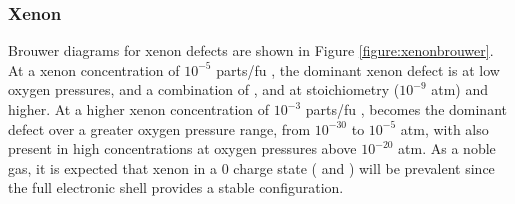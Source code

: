 \subsubsection{Xenon}

Brouwer diagrams for xenon defects are shown in Figure \ref{figure:xenonbrouwer}. At a xenon concentration of $10^{-5}$ parts/fu \zirconia , the dominant xenon defect is  at low oxygen pressures, and a combination of ,  and  at stoichiometry ($10^{-9}$ atm) and higher. At a higher xenon concentration of $10^{-3}$ parts/fu \zirconia ,  becomes the dominant defect over a greater oxygen pressure range, from $10^{-30}$ to $10^{-5}$ atm, with  also present in high concentrations at oxygen pressures above $10^{-20}$ atm. As a noble gas, it is expected that xenon in a 0 charge state ( and ) will be prevalent since the full electronic shell provides a stable configuration.

